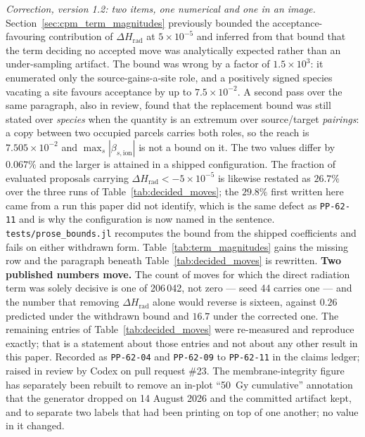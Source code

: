 \documentclass[11pt]{article}
\begin{document}
\emph{Correction, version 1.2: two items, one numerical and one in an image.}
Section~\ref{sec:cpm_term_magnitudes} previously bounded the acceptance-favouring contribution of
$\Delta H_{\mathrm{rad}}$ at $5\times10^{-5}$ and inferred from that bound that the term deciding
no accepted move was analytically expected rather than an under-sampling artifact. The bound was
wrong by a factor of $1.5\times10^{3}$: it enumerated only the source-gains-a-site role, and a
positively signed species vacating a site favours acceptance by up to $7.5\times10^{-2}$. A second
pass over the same paragraph, also in review, found that the replacement bound was still stated over
\emph{species} when the quantity is an extremum over source/target \emph{pairings}: a copy between
two occupied parcels carries both roles, so the reach is $7.505\times10^{-2}$ and
$\max_s|\beta_{s,\mathrm{ion}}|$ is not a bound on it. The two values differ by $0.067\%$ and the
larger is attained in a shipped configuration. The fraction of evaluated proposals carrying
$\Delta H_{\mathrm{rad}} < -5\times10^{-5}$ is likewise restated as $26.7\%$ over the three runs of
Table~\ref{tab:decided_moves}; the $29.8\%$ first written here came from a run this paper did not
identify, which is the same defect as \texttt{PP-62-11} and is why the configuration is now named in
the sentence. \texttt{tests/prose\_bounds.jl} recomputes the bound from the shipped coefficients and
fails on either withdrawn form.
Table~\ref{tab:term_magnitudes} gains the missing row and the paragraph beneath
Table~\ref{tab:decided_moves} is rewritten. \textbf{Two published numbers move.} The count of moves
for which the direct radiation term was solely decisive is one of 206\,042, not zero --- seed 44
carries one --- and the number that removing $\Delta H_{\mathrm{rad}}$ alone would reverse is
sixteen, against $0.26$ predicted under the withdrawn bound and $16.7$ under the corrected one. The
remaining entries of Table~\ref{tab:decided_moves} were re-measured and reproduce exactly; that is
a statement about those entries and not about any other result in this paper. Recorded as
\texttt{PP-62-04} and \texttt{PP-62-09} to \texttt{PP-62-11} in the claims ledger; raised in review
by Codex on pull request \#23. The membrane-integrity figure has separately been rebuilt to remove an in-plot
``50~Gy cumulative'' annotation that the generator dropped on 14 August 2026 and the committed
artifact kept, and to separate two labels that had been printing on top of one another; no value in
it changed.
\end{document}
